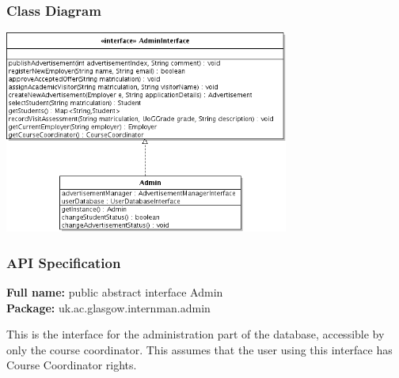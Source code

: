 \documentclass[11pt]{l3deliverable}
\begin{document}
\subsubsection{Class Diagram}
\begin{centering}
  \includegraphics[width=0.7\textwidth]{adminClassDiagram.png}
\end{centering}
\subsubsection{API Specification}

\textbf{Full name:} public abstract interface Admin\\

\textbf{Package:} uk.ac.glasgow.internman.admin

This is the interface for the administration part of the database, accessible by
only the course coordinator.
This assumes that the user using this interface has Course Coordinator
rights.
\end{document}
